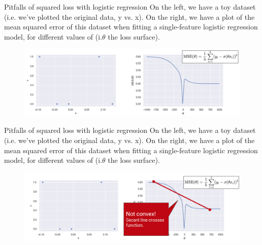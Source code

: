\documentclass[aspectratio=169]{../latex_main/tntbeamer}  %
\begin{document}
	
	\begin{frame}{Pitfalls of squared loss with logistic regression}
	    On the left, we have a toy dataset (i.e. we’ve plotted the original data, y vs. x). On the right, we have a plot of the mean squared error of this dataset when fitting a single-feature logistic regression model, for different values of (i.$\theta$ the loss surface).
	    \begin{figure}
	        \centering
	        \includegraphics[scale=.4]{Bild13}
	    \end{figure}
	\end{frame}
	
	
	\begin{frame}{Pitfalls of squared loss with logistic regression}
	    On the left, we have a toy dataset (i.e. we’ve plotted the original data, y vs. x). On the right, we have a plot of the mean squared error of this dataset when fitting a single-feature logistic regression model, for different values of (i.$\theta$ the loss surface).
	    \begin{figure}
	        \centering
	        \includegraphics[scale=.4]{Bild14}
	    \end{figure}
	\end{frame}
	
\end{document}

